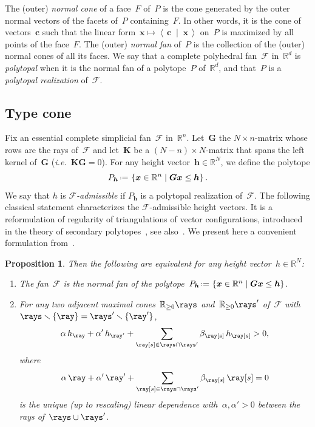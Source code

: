 \documentclass{amsart}
\newtheorem{proposition}[theorem]{Proposition}
\theoremstyle{definition}
\newcommand{\R}{\mathbb{R}} %
\renewcommand{\b}[1]{{\boldsymbol{#1}}} %
\newcommand{\set}[2]{\left\{ #1 \;\middle|\; #2 \right\}} %
\newcommand{\ssm}{\smallsetminus} %
\newcommand{\dotprod}[2]{\left\langle \, #1 \; \middle| \; #2 \, \right\rangle} %
\newcommand{\eqdef}{\mbox{\,\raisebox{0.2ex}{\scriptsize\ensuremath{\mathrm:}}\ensuremath{=}\,}} %
\newcommand{\ie}{\textit{i.e.}~} %
\newcommand{\darkblue}{\color{darkblue}} %
\newcommand{\defn}[1]{\textsl{\darkblue #1}} %
\newcommand{\Fan}{\mathcal{F}} %
\begin{document}
The (outer) \defn{normal cone} of a face~$F$ of~$P$ is the cone generated by the outer normal vectors of the facets of~$P$ containing~$F$.
In other words, it is the cone of vectors~$\b{c}$ such that the linear form~${\b{x} \mapsto \dotprod{\b{c}}{\b{x}}}$ on~$P$ is maximized by all points of the face~$F$.
The (outer) \defn{normal fan} of~$P$ is the collection of the (outer) normal cones of all its faces.
We say that a complete polyhedral fan~$\Fan$ in~$\R^d$ is \defn{polytopal} when it is the normal fan of a polytope~$P$ of~$\R^d$, and that~$P$ is a \defn{polytopal realization} of~$\Fan$.


\subsection{Type cone}

Fix an essential complete simplicial fan~$\Fan$ in~$\R^n$. Let~$\b{G}$ the $N \times n$-matrix whose rows are the rays of~$\Fan$ and let~$\b{K}$ be a $(N-n) \times N$-matrix that spans the left kernel of~$\b{G}$ (\ie $\b{K}\b{G} = 0$). For any height vector~$\b{h} \in \R^N$, we define the polytope
\[
P_\b{h} \eqdef \set{\b{x} \in \R^n}{\b{G}\b{x} \le \b{h}}.
\]
We say that $h$ is \defn{$\Fan$-admissible} if $P_\b{h}$ is a polytopal realization of~$\Fan$.
The following classical statement characterizes the $\Fan$-admissible height vectors.
It is a reformulation of regularity of triangulations of vector configurations, introduced in the theory of secondary polytopes~\cite{GelfandKapranovZelevinsky}, see also~\cite{DeLoeraRambauSantos}.
We present here a convenient formulation from~\cite[Lem.~2.1]{ChapotonFominZelevinsky}.

\begin{proposition}
\label{prop:characterizationPolytopalFan}
Then the following are equivalent for any height vector~$h \in \R^N$:
\begin{enumerate}
\item The fan~$\Fan$ is the normal fan of the polytope~$P_\b{h} \eqdef \set{\b{x} \in \R^n}{\b{G}\b{x} \le \b{h}}$.
\item For any two adjacent maximal cones~$\R_{\ge0}\rays$ and~$\R_{\ge0}\rays'$ of~$\Fan$ with~$\rays \ssm \{\ray\} = \rays' \ssm \{\ray'\}$,
\[
\alpha \, h_{\ray} + \alpha' \, h_{\ray'} + \sum_{\ray[s] \in \rays \cap \rays'} \beta_{\ray[s]} \, h_{\ray[s]} > 0,
\]
where
\[
\alpha \, \ray + \alpha' \, \ray' + \sum_{\ray[s] \in \rays \cap \rays'} \beta_{\ray[s]} \, \ray[s] = 0
\]
is the unique (up to rescaling) linear dependence with~$\alpha, \alpha' > 0$ between the rays of~$\rays \cup \rays'$.
\end{enumerate}
\end{proposition}
\end{document}
